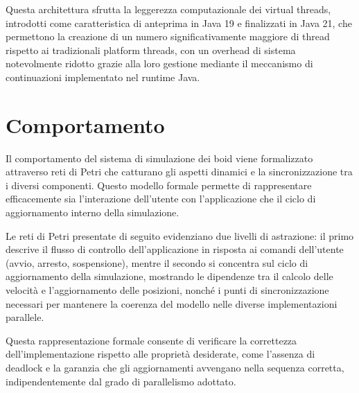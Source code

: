 \documentclass[a4paper,12pt]{report}
\begin{document}
Questa architettura sfrutta la leggerezza computazionale dei virtual threads, introdotti come caratteristica di anteprima in Java 19 e finalizzati in Java 21, che permettono la creazione di un numero significativamente maggiore di thread rispetto ai tradizionali platform threads, con un overhead di sistema notevolmente ridotto grazie alla loro gestione mediante il meccanismo di continuazioni implementato nel runtime Java.

\chapter{Comportamento}
Il comportamento del sistema di simulazione dei boid viene formalizzato attraverso reti di Petri che catturano gli aspetti dinamici e la sincronizzazione tra i diversi componenti. Questo modello formale permette di rappresentare efficacemente sia l'interazione dell'utente con l'applicazione che il ciclo di aggiornamento interno della simulazione.

Le reti di Petri presentate di seguito evidenziano due livelli di astrazione: il primo descrive il flusso di controllo dell'applicazione in risposta ai comandi dell'utente (avvio, arresto, sospensione), mentre il secondo si concentra sul ciclo di aggiornamento della simulazione, mostrando le dipendenze tra il calcolo delle velocità e l'aggiornamento delle posizioni, nonché i punti di sincronizzazione necessari per mantenere la coerenza del modello nelle diverse implementazioni parallele.

Questa rappresentazione formale consente di verificare la correttezza dell'implementazione rispetto alle proprietà desiderate, come l'assenza di deadlock e la garanzia che gli aggiornamenti avvengano nella sequenza corretta, indipendentemente dal grado di parallelismo adottato.
\end{document}

